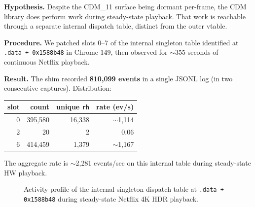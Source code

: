 \documentclass[11pt,letterpaper]{article}
\begin{document}
\textbf{Hypothesis.} Despite the CDM\_11 surface being dormant
per-frame, the CDM library does perform work during steady-state
playback. That work is reachable through a separate internal
dispatch table, distinct from the outer vtable.

\textbf{Procedure.} We patched slots 0--7 of the internal singleton
table identified at \texttt{.data + 0x1588b48} in Chrome 149, then
observed for $\sim$355 seconds of continuous Netflix playback.

\textbf{Result.} The shim recorded \textbf{810{,}099 events} in a
single JSONL log (in two consecutive captures). Distribution:

\begin{center}\small
\begin{tabular}{rrrr}
\toprule
\textbf{slot} & \textbf{count} & \textbf{unique \texttt{rh}} & \textbf{rate (ev/s)} \\
\midrule
0 & 395{,}580 & 16{,}338 & $\sim$1{,}114 \\
2 &     20    &  2     & 0.06 \\
6 & 414{,}459 & 1{,}379 & $\sim$1{,}167 \\
\bottomrule
\end{tabular}
\end{center}

\noindent The aggregate rate is $\sim$2{,}281 events/sec on this
internal table during steady-state HW playback.

\begin{figure}[h]
\centering
{}
\caption{Activity profile of the internal singleton dispatch table at
\texttt{.data + 0x1588b48} during steady-state Netflix 4K HDR
playback.}
\label{fig:singleton-rate}
\end{figure}
\end{document}
